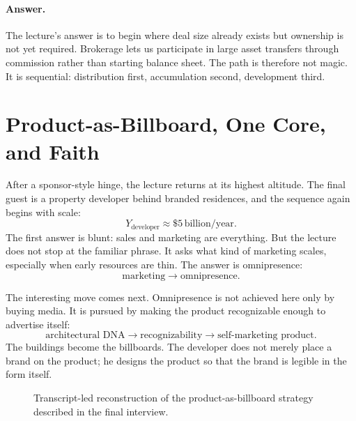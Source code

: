 \paragraph{Answer.} The lecture's answer is to begin where deal size already exists but ownership is not yet required. Brokerage lets us participate in large asset transfers through commission rather than starting balance sheet. The path is therefore not magic. It is sequential: distribution first, accumulation second, development third.

\section{Product-as-Billboard, One Core, and Faith}

After a sponsor-style hinge, the lecture returns at its highest altitude. The final guest is a property developer behind branded residences, and the sequence again begins with scale:
\begin{equation}
Y_{\text{developer}} \approx \$5\,\text{billion}/\text{year}.
\end{equation}
The first answer is blunt: sales and marketing are everything. But the lecture does not stop at the familiar phrase. It asks what kind of marketing scales, especially when early resources are thin. The answer is omnipresence:
\begin{equation}
\text{marketing} \to \text{omnipresence}.
\end{equation}

The interesting move comes next. Omnipresence is not achieved here only by buying media. It is pursued by making the product recognizable enough to advertise itself:
\begin{equation}
\text{architectural DNA}
\to
\text{recognizability}
\to
\text{self-marketing product}.
\end{equation}
The buildings become the billboards. The developer does not merely place a brand on the product; he designs the product so that the brand is legible in the form itself.

\begin{figure}[h]
\centering
{}
\caption{Transcript-led reconstruction of the product-as-billboard strategy described in the final interview.}
\end{figure}

